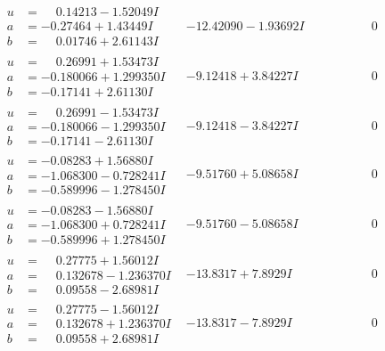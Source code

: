 \documentclass[1p]{elsarticle_modified}
\theoremstyle{definition}
\begin{document}
$$\begin{array}{c|c|c}
\begin{aligned}
u &= \phantom{-}0.14213 - 1.52049 I \\
a &= -0.27464 + 1.43449 I \\
b &= \phantom{-}0.01746 + 2.61143 I\end{aligned}
 & -12.42090 - 1.93692 I & \phantom{-0.000000 } 0 \\ \hline\begin{aligned}
u &= \phantom{-}0.26991 + 1.53473 I \\
a &= -0.180066 + 1.299350 I \\
b &= -0.17141 + 2.61130 I\end{aligned}
 & -9.12418 + 3.84227 I & \phantom{-0.000000 } 0 \\ \hline\begin{aligned}
u &= \phantom{-}0.26991 - 1.53473 I \\
a &= -0.180066 - 1.299350 I \\
b &= -0.17141 - 2.61130 I\end{aligned}
 & -9.12418 - 3.84227 I & \phantom{-0.000000 } 0 \\ \hline\begin{aligned}
u &= -0.08283 + 1.56880 I \\
a &= -1.068300 - 0.728241 I \\
b &= -0.589996 - 1.278450 I\end{aligned}
 & -9.51760 + 5.08658 I & \phantom{-0.000000 } 0 \\ \hline\begin{aligned}
u &= -0.08283 - 1.56880 I \\
a &= -1.068300 + 0.728241 I \\
b &= -0.589996 + 1.278450 I\end{aligned}
 & -9.51760 - 5.08658 I & \phantom{-0.000000 } 0 \\ \hline\begin{aligned}
u &= \phantom{-}0.27775 + 1.56012 I \\
a &= \phantom{-}0.132678 - 1.236370 I \\
b &= \phantom{-}0.09558 - 2.68981 I\end{aligned}
 & -13.8317 + 7.8929 I & \phantom{-0.000000 } 0 \\ \hline\begin{aligned}
u &= \phantom{-}0.27775 - 1.56012 I \\
a &= \phantom{-}0.132678 + 1.236370 I \\
b &= \phantom{-}0.09558 + 2.68981 I\end{aligned}
 & -13.8317 - 7.8929 I & \phantom{-0.000000 } 0 \\ \hline\begin{aligned}

\end{aligned}
\end{array}$$
\end{document}
